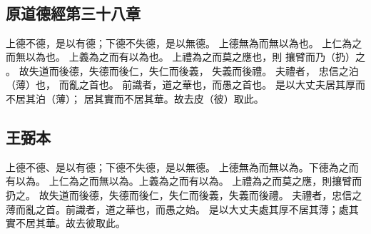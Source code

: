 ﻿%
%

\chapter{~}

\section{原道德經第三十八章}

\begin{withgezhu}

\zhsong


\colorbox{adding-color}{上德不德，是以有德；下德不失德，是以無}德。
上德無\colorbox{adding-color}{為而}無以為也。
上仁為之\colorbox{adding-color}{而無}以為也。
上義為之而有以為也。
上禮\colorbox{adding-color}{為之而莫之應也，則}
攘臂而乃（\textcolor{tongjia-color}{扔}）之
。
故失道而後德，失德而後仁，失仁而後義，
\colorbox{adding-color}{失義而後禮。}
\colorbox{adding-color}{夫禮者，}
\colorbox{adding-color}{忠信之泊（\textcolor{tongjia-color}{薄}）也}，
而亂之首也。
\colorbox{adding-color}{前識者}，道之華也，而愚之首也。
是以大丈夫居\colorbox{missing-color}{其厚而不}居其泊（\textcolor{tongjia-color}{薄}）；
居其實而不居其華。故去皮（\textcolor{tongjia-color}{彼}）取此。

\end{withgezhu}

\section{王弼本}

\begin{withgezhu}

\zhsong

上德不德、是以有德；下德不失德，是以無德。
上德無為而無以為。下德為之而有以為。
上仁為之而無以為。上義為之而有以為。
上禮為之而莫之應，則攘臂而扔之。
故失道而後德，失德而後仁，失仁而後義，失義而後禮。
夫禮者，忠信之薄而亂之首。前識者，道之華也，而愚之始。
是以大丈夫處其厚不居其薄；處其實不居其華。故去彼取此。

\end{withgezhu}
